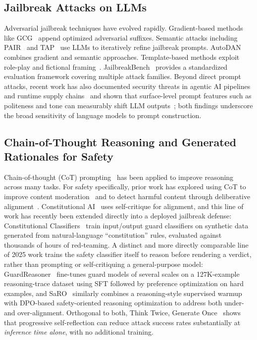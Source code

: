 \documentclass[superintelligence,article,accept,moreauthors]{Definitions/mdpi}
\renewcommand{\highlighting}[1]{#1}
\begin{document}
\subsection{\highlighting{Jailbreak Attacks on LLMs}}
Adversarial jailbreak techniques have evolved rapidly. Gradient-based methods like GCG~\citep{zou2023universal} append optimized adversarial suffixes. Semantic attacks including PAIR~\citep{chao2023jailbreaking} and TAP~\citep{mehrotra2024tree} use LLMs to iteratively refine jailbreak prompts. AutoDAN~\citep{liu2024autodan} combines gradient and semantic approaches. Template-based methods exploit role-play and fictional framing~\citep{wei2024jailbroken, shen2024anything}. JailbreakBench~\citep{chao2024jailbreakbench} provides a standardized evaluation framework covering multiple attack families. Beyond direct prompt attacks, recent work has also documented security threats in agentic AI pipelines and runtime supply chains~\citep{jiang2026agentic} and shown that surface-level prompt features such as politeness and tone can measurably shift LLM outputs~\citep{cai2025tone}; both findings underscore the broad sensitivity of language models to prompt construction.

\subsection{\highlighting{Chain-of-Thought Reasoning and Generated Rationales for Safety}}
\label{sec:related-reasoning}
Chain-of-thought (CoT) prompting~\citep{wei2022chain} has been applied to improve reasoning across many tasks. For safety specifically, prior work has explored using CoT to improve content moderation~\citep{wang2024chain} and to detect harmful content through deliberative alignment~\citep{bai2024deliberative}. Constitutional AI~\citep{bai2022constitutional} uses self-critique for alignment, and this line of work has recently been extended directly into a deployed jailbreak defense: Constitutional Classifiers~\citep{sharma2025constitutional} train input/output guard classifiers on synthetic data generated from natural-language ``constitution'' rules, evaluated against thousands of hours of red-teaming. A distinct and more directly comparable line of 2025 work trains the safety classifier itself to reason before rendering a verdict, rather than prompting or self-critiquing a general-purpose model: \mbox{GuardReasoner~\citep{liu2025guardreasoner}} fine-tunes guard models of several scales on a 127K-example reasoning-trace dataset using SFT followed by preference optimization on hard examples, and SaRO~\citep{mou2025saro} similarly combines a reasoning-style supervised warmup with DPO-based safety-oriented reasoning optimization to address both under- and over-alignment. Orthogonal to both, Think Twice, Generate Once~\citep{phan2025thinktwice} shows that progressive self-reflection can reduce attack success rates substantially at \emph{inference time alone}, with no additional training.
\end{document}
